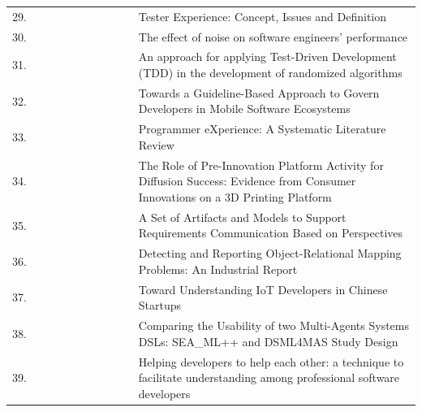 \documentclass[english, 12pt, a4paper, sci, utf8, a-1b, online]{aaltothesis}
\begin{document}
\begin{center}
\begin{longtable}{p{0.05\linewidth}p{0.25\linewidth}p{0.7\linewidth}}
    29. & \cite{ekwoge2017tester}                           & Tester Experience: Concept, Issues and Definition                                                                                           \\
    30. & \cite{romano2018effect}                           & The effect of noise on software engineers' performance                                                                                      \\
    31. & \cite{ivo2018approach}                            & An approach for applying Test-Driven Development (TDD) in the development of randomized algorithms                                          \\
    32. & \cite{de2017towards}                              & Towards a Guideline-Based Approach to Govern Developers in Mobile Software Ecosystems                                                       \\
    33. & \cite{programmer-experience}                      & Programmer eXperience: A Systematic Literature Review                                                                                       \\
    34. & \cite{claussen2019role}                           & The Role of Pre-Innovation Platform Activity for Diffusion Success: Evidence from Consumer Innovations on a 3D Printing Platform            \\
    35. & \cite{oran2017set}                                & A Set of Artifacts and Models to Support Requirements Communication Based on Perspectives                                                   \\
    36. & \cite{nazariodetecting}                           & Detecting and Reporting Object-Relational Mapping Problems: An Industrial Report                                                            \\
    37. & \cite{zhang2018toward}                            & Toward Understanding IoT Developers in Chinese Startups                                                                                     \\
    38. & \cite{silvacomparing}                             & Comparing the Usability of two Multi-Agents Systems DSLs: SEA\_ML++ and DSML4MAS Study Design                                               \\
    39. & \cite{ollis2019helping}                           & Helping developers to help each other: a technique to facilitate understanding among professional software developers
  \end{longtable}
\end{center}
\end{document}
